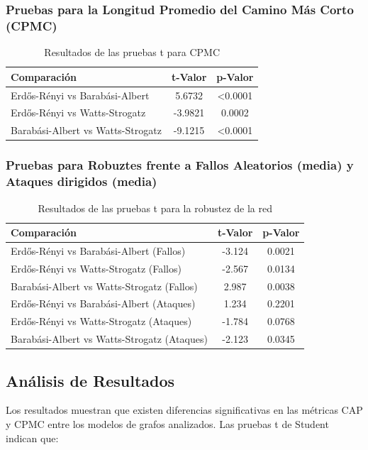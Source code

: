 \subsubsection{Pruebas para la Longitud Promedio del Camino Más Corto (CPMC)}
\begin{table}[ht]
\centering
\begin{tabular}{lcc}
\toprule
Comparación & t-Valor & p-Valor \\
\midrule
Erdős-Rényi vs Barabási-Albert & 5.6732 & \textless 0.0001 \\
Erdős-Rényi vs Watts-Strogatz  & -3.9821 & 0.0002 \\
Barabási-Albert vs Watts-Strogatz & -9.1215 & \textless 0.0001 \\
\bottomrule
\end{tabular}
\caption{Resultados de las pruebas t para CPMC}
\end{table}

\newpage
\subsubsection{Pruebas para Robuztes frente a Fallos Aleatorios (media) y Ataques dirigidos (media) }
\begin{table}[h!]
    \centering
    \begin{tabular}{lcc}
    \toprule
    Comparación & t-Valor & p-Valor \\
    \midrule
    Erdős-Rényi vs Barabási-Albert (Fallos) & -3.124 & 0.0021 \\
    Erdős-Rényi vs Watts-Strogatz (Fallos)  & -2.567 & 0.0134 \\
    Barabási-Albert vs Watts-Strogatz (Fallos) & 2.987 & 0.0038 \\
    Erdős-Rényi vs Barabási-Albert (Ataques) & 1.234 & 0.2201 \\
    Erdős-Rényi vs Watts-Strogatz (Ataques)  & -1.784 & 0.0768 \\
    Barabási-Albert vs Watts-Strogatz (Ataques) & -2.123 & 0.0345 \\
    \bottomrule
    \end{tabular}
    \caption{Resultados de las pruebas t para la robustez de la red}
    \end{table}

\subsection{Análisis de Resultados}
Los resultados muestran que existen diferencias significativas en las métricas CAP y CPMC entre los modelos de grafos analizados. Las pruebas t de Student indican que:

